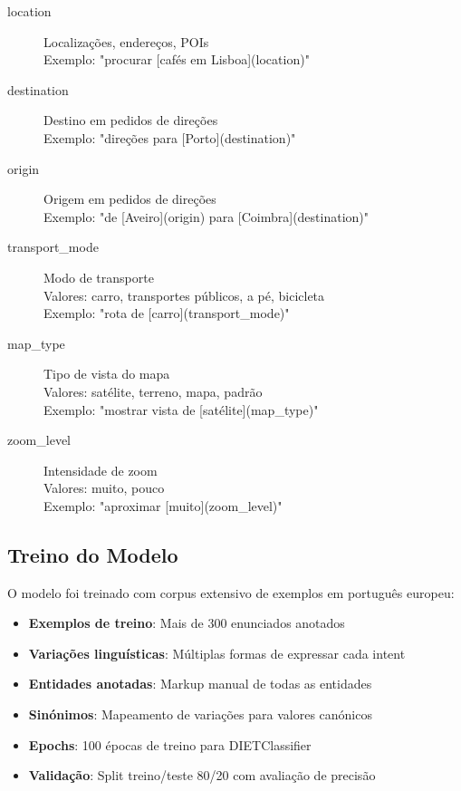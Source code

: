 \begin{description}
    \item[location] Localizações, endereços, POIs \\
    Exemplo: "procurar [cafés em Lisboa](location)"

    \item[destination] Destino em pedidos de direções \\
    Exemplo: "direções para [Porto](destination)"

    \item[origin] Origem em pedidos de direções \\
    Exemplo: "de [Aveiro](origin) para [Coimbra](destination)"

    \item[transport\_mode] Modo de transporte \\
    Valores: carro, transportes públicos, a pé, bicicleta \\
    Exemplo: "rota de [carro](transport\_mode)"

    \item[map\_type] Tipo de vista do mapa \\
    Valores: satélite, terreno, mapa, padrão \\
    Exemplo: "mostrar vista de [satélite](map\_type)"

    \item[zoom\_level] Intensidade de zoom \\
    Valores: muito, pouco \\
    Exemplo: "aproximar [muito](zoom\_level)"
\end{description}

\subsection{Treino do Modelo}

O modelo foi treinado com corpus extensivo de exemplos em português europeu:

\begin{itemize}
    \item \textbf{Exemplos de treino}: Mais de 300 enunciados anotados
    \item \textbf{Variações linguísticas}: Múltiplas formas de expressar cada intent
    \item \textbf{Entidades anotadas}: Markup manual de todas as entidades
    \item \textbf{Sinónimos}: Mapeamento de variações para valores canónicos
    \item \textbf{Epochs}: 100 épocas de treino para DIETClassifier
    \item \textbf{Validação}: Split treino/teste 80/20 com avaliação de precisão
\end{itemize}

